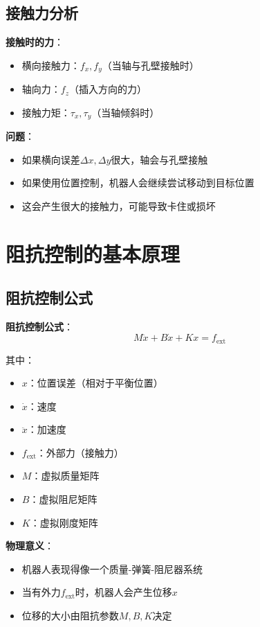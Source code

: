 \documentclass[12pt,a4paper]{article}
\begin{document}
\subsection{接触力分析}

\textbf{接触时的力}：
\begin{itemize}
\item 横向接触力：$f_x, f_y$（当轴与孔壁接触时）
\item 轴向力：$f_z$（插入方向的力）
\item 接触力矩：$\tau_x, \tau_y$（当轴倾斜时）
\end{itemize}

\textbf{问题}：
\begin{itemize}
\item 如果横向误差$\Delta x, \Delta y$很大，轴会与孔壁接触
\item 如果使用位置控制，机器人会继续尝试移动到目标位置
\item 这会产生很大的接触力，可能导致卡住或损坏
\end{itemize}

\section{阻抗控制的基本原理}

\subsection{阻抗控制公式}

\textbf{阻抗控制公式}：
\begin{equation}
M\ddot{x} + B\dot{x} + Kx = f_{\text{ext}} \tag{11.64}
\end{equation}

其中：
\begin{itemize}
\item $x$：位置误差（相对于平衡位置）
\item $\dot{x}$：速度
\item $\ddot{x}$：加速度
\item $f_{\text{ext}}$：外部力（接触力）
\item $M$：虚拟质量矩阵
\item $B$：虚拟阻尼矩阵
\item $K$：虚拟刚度矩阵
\end{itemize}

\textbf{物理意义}：
\begin{itemize}
\item 机器人表现得像一个质量-弹簧-阻尼器系统
\item 当有外力$f_{\text{ext}}$时，机器人会产生位移$x$
\item 位移的大小由阻抗参数$M, B, K$决定
\end{itemize}
\end{document}
